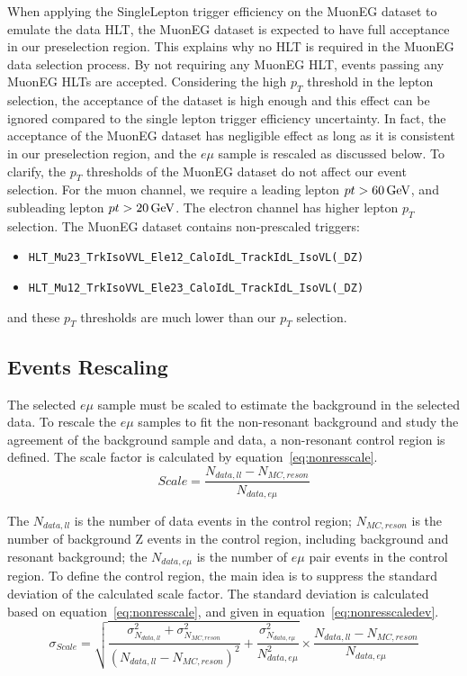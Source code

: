 \vspace{0.3cm}
When applying the SingleLepton trigger efficiency on the MuonEG dataset to emulate the data HLT, the MuonEG dataset is expected to have full acceptance in our preselection region. This explains why no HLT is required in the MuonEG data selection process. By not requiring any MuonEG HLT, events passing any MuonEG HLTs are accepted. Considering the high $p_T$ threshold in the lepton selection, the acceptance of the dataset is high enough and this effect can be ignored compared to the single lepton trigger efficiency uncertainty. In fact, the acceptance of the MuonEG dataset has negligible effect as long as it is consistent in our preselection region, and the $e\mu$ sample is rescaled as discussed below. To clarify, the $p_T$ thresholds of the MuonEG dataset do not affect our event selection. For the muon channel, we require a leading lepton $pt>60\,\text{Ge\hspace{-.08em}V}$, and subleading lepton $pt>20\,\text{Ge\hspace{-.08em}V}$. The electron channel has higher lepton $p_T$ selection. The MuonEG dataset contains non-prescaled triggers:
\begin{itemize}
\item \texttt{HLT\_Mu23\_TrkIsoVVL\_Ele12\_CaloIdL\_TrackIdL\_IsoVL(\_DZ)} 
\item \texttt{HLT\_Mu12\_TrkIsoVVL\_Ele23\_CaloIdL\_TrackIdL\_IsoVL(\_DZ)}
\end{itemize}
and these $p_T$ thresholds are much lower than our $p_T$ selection.

\subsection{ Events Rescaling}
The selected $e\mu$ sample must be scaled to estimate the background in the selected data. To rescale the $e\mu$ samples to fit the non-resonant background and study the agreement of the background sample and data, a non-resonant control region is defined. The scale factor is calculated by equation~\ref{eq:nonresscale}.
\begin{equation} \label{eq:nonresscale}
  Scale  =  \frac{N_{data,ll}-N_{MC,reson}}{N_{data,e\mu}}
\end{equation}

The $N_{data,ll}$ is the number of data events in the control region; $N_{MC,reson}$ is the number of background Z events in the control region, including \Zjets background and resonant background; the $N_{data,e\mu}$ is the number of $e\mu$ pair events in the control region. To define the control region, the main idea is to suppress the standard deviation of the calculated scale factor. The standard deviation is calculated based on equation~\ref{eq:nonresscale}, and given in equation~\ref{eq:nonresscaledev}.
\begin{equation} \label{eq:nonresscaledev}
  \sigma_{Scale}  = \sqrt{\frac{\sigma^{2}_{N_{data,ll}}+\sigma^{2}_{N_{MC,reson}}}{(N_{data,ll}-N_{MC,reson})^{2}}+\frac{\sigma^{2}_{N_{data,e\mu}}}{N^{2}_{data,e\mu}}}\times \frac{N_{data,ll}-N_{MC,reson}}{N_{data,e\mu}}
\end{equation}

